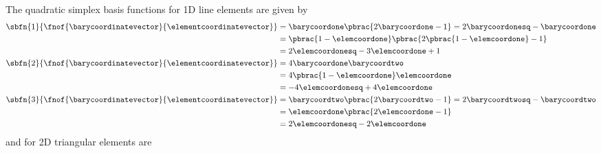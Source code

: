 The quadratic simplex basis functions for 1D line elements are given by
\begin{equation}
\begin{aligned}
  \sbfn{1}{\fnof{\barycoordinatevector}{\elementcoordinatevector}}&=\barycoordone\pbrac{2\barycoordone-1}=2\barycoordonesq-\barycoordone\\
  &=\pbrac{1-\elemcoordone}\pbrac{2\pbrac{1-\elemcoordone}-1}\\
  &=2\elemcoordonesq-3\elemcoordone+1\\
  \sbfn{2}{\fnof{\barycoordinatevector}{\elementcoordinatevector}}&=4\barycoordone\barycoordtwo \\
  &=4\pbrac{1-\elemcoordone}\elemcoordone\\
  &=-4\elemcoordonesq+4\elemcoordone\\
  \sbfn{3}{\fnof{\barycoordinatevector}{\elementcoordinatevector}}&=\barycoordtwo\pbrac{2\barycoordtwo-1}=2\barycoordtwosq-\barycoordtwo\\
  &=\elemcoordone\pbrac{2\elemcoordone-1}\\
  &=2\elemcoordonesq-2\elemcoordone
\end{aligned}
\label{eqn:OneDQuadraticSimplexBasisFunctions}
\end{equation}
and for 2D triangular elements are
